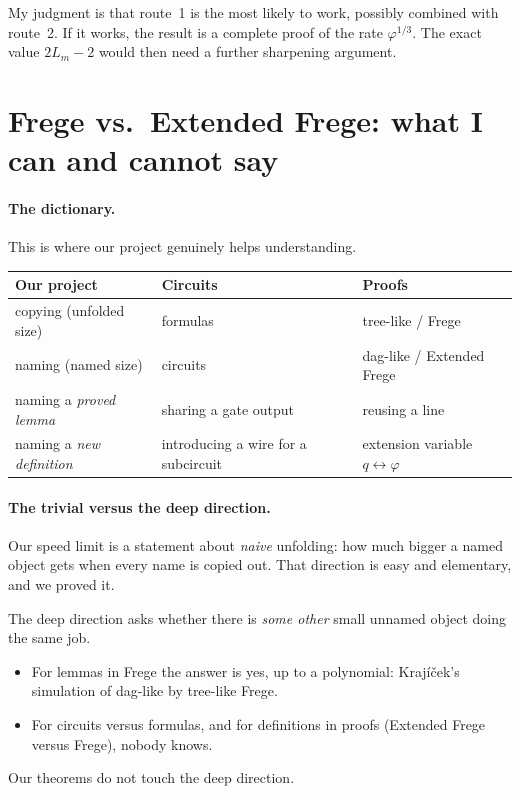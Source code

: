 \documentclass[11pt]{article}
\theoremstyle{remark}
\begin{document}
\noindent My judgment is that route~1 is the most likely to work, possibly combined with
route~2. If it works, the result is a complete proof of the rate $\varphi^{1/3}$. The exact
value $2L_m-2$ would then need a further sharpening argument.

\section{Frege vs.\ Extended Frege: what I can and cannot say}

\paragraph{The dictionary.} This is where our project genuinely helps understanding.
\begin{center}\small
\begin{tabular}{lll}
\toprule
Our project & Circuits & Proofs \\
\midrule
copying (unfolded size) & formulas & tree-like / Frege \\
naming (named size) & circuits & dag-like / Extended Frege \\
naming a \emph{proved lemma} & sharing a gate output & reusing a line \\
naming a \emph{new definition} & introducing a wire for a subcircuit & extension variable $q\leftrightarrow\varphi$ \\
\bottomrule
\end{tabular}
\end{center}

\paragraph{The trivial versus the deep direction.} Our speed limit is a statement about
\emph{naive} unfolding: how much bigger a named object gets when every name is copied out.
That direction is easy and elementary, and we proved it.

The deep direction asks whether there is \emph{some other} small unnamed object doing the
same job.
\begin{itemize}
\item For lemmas in Frege the answer is yes, up to a polynomial: Kraj\'i\v{c}ek's
  simulation of dag-like by tree-like Frege.
\item For circuits versus formulas, and for definitions in proofs (Extended Frege versus
  Frege), nobody knows.
\end{itemize}
Our theorems do not touch the deep direction.
\end{document}
